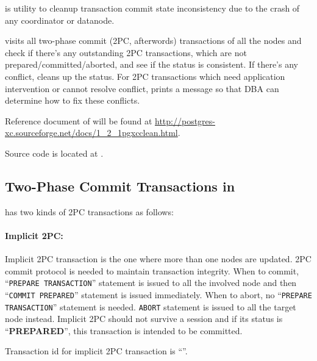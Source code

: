 %
%

   is \XC{} utility to cleanup transaction commit state inconsistency due to
  the crash of any coordinator or datanode.
  
   visits all two-phase commit (2PC, afterwords) transactions of all the
  nodes and check if there's any outstanding 2PC transactions, which are not
  prepared/committed/aborted, and see if the status is consistent.
  If there's any conflict,  cleans up the status.
  For 2PC transactions which need application intervention or cannot resolve conflict,
   prints a message so that DBA can determine how to fix these conflicts.
  
  Reference document of  will be found at
  \url{http://postgres-xc.sourceforge.net/docs/1_2_1pgxcclean.html}.
  
  Source code is located at .



\subsection{Two-Phase Commit Transactions in \XC}

  \XC{} has two kinds of 2PC transactions as follows:
  
  \paragraph*{{\bf Implicit 2PC}:}
    	Implicit 2PC transaction is the one where more than one nodes are updated.
    	2PC commit protocol is needed
    	to maintain transaction integrity.
    	When to commit, ``\texttt{PREPARE TRANSACTION}'' statement is issued to all the involved node and then
    	``\texttt{COMMIT PREPARED}'' statement is issued immediately.
    	When to abort, no ``\texttt{PREPARE TRANSACTION}'' statement is needed.
    	\texttt{ABORT} statement is issued to all the target node instead.
    	Implicit 2PC should not survive a session and if its
    	status is ``{\bf PREPARED}'', this transaction is intended to be committed.
    
    	Transaction id for implicit 2PC transaction is ``''.
  	
